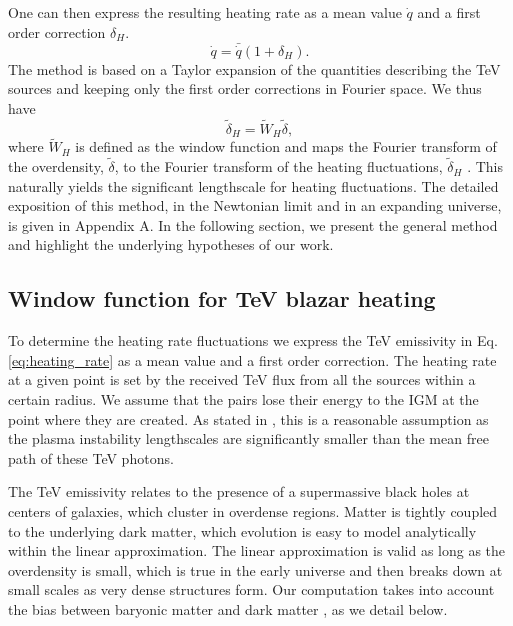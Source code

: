 \documentclass[twocolumns]{emulateapj}
\begin{document}
One can then express the resulting heating rate as a mean value $\dot{q}$ and a first order correction $\delta_H$. 
\begin{equation}
  \label{eq:delta_h}
  \dot{q}=\bar{\dot{q}}(1+\delta_H).
\end{equation}
 The method is based on a Taylor expansion of the quantities describing the TeV sources and keeping only the first order corrections in Fourier space.  We thus have
\begin{equation}
  \label{eq:use_window}
  \tilde{\delta}_H=\tilde{W}_H\tilde{\delta},
\end{equation}
where $\tilde{W}_H$ is defined as the window function and maps the Fourier transform of the overdensity, $\tilde{\delta}$, to the Fourier transform of the heating fluctuations, $\tilde{\delta}_H$ . This naturally yields the significant lengthscale for heating fluctuations.
The detailed exposition of this method, in the Newtonian limit and in an expanding universe, is given in Appendix A. In the following section, we present the general method and highlight the underlying hypotheses of our work.


\subsection{Window function for TeV blazar heating}\label{sec:window}
To determine the heating rate fluctuations we express the TeV emissivity in Eq. \ref{eq:heating_rate} as a mean value and a first order correction. The heating rate at a given point is set by the received TeV flux from all the sources within a certain radius. We assume that the pairs lose their energy to the IGM at the point where they are created.  As stated in \citet{2012ApJ...752...22B}, this is a reasonable assumption as the plasma instability lengthscales are significantly smaller than the mean free path of these TeV photons. 

 The TeV emissivity relates to the presence of a supermassive black holes at centers of galaxies, which cluster in overdense regions. Matter is tightly coupled to the underlying dark matter, which evolution is easy to model analytically within the linear approximation.  The linear approximation is valid as long as the overdensity is small, which is true in the early universe and then breaks down at small scales as very dense structures form.  Our computation takes into account the bias between baryonic matter and dark matter \citep{1996MNRAS.282..347M}, as we detail below.
\end{document}
